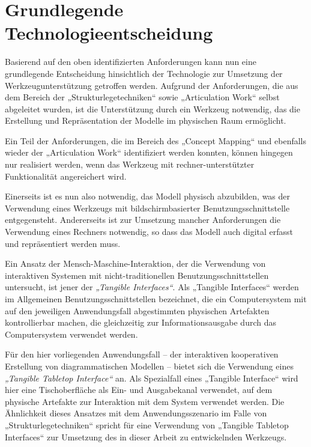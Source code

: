 

\section{Grundlegende Technologieentscheidung} %
\label{sec:grundlegende_technologieentscheidung}

Basierend auf den oben identifizierten Anforderungen kann nun eine grundlegende Entscheidung hinsichtlich der Technologie zur Umsetzung der Werkzeugunterstützung getroffen werden. Aufgrund der Anforderungen, die aus dem Bereich der „Strukturlegetechniken“ sowie „Articulation Work“ selbst abgeleitet wurden, ist die Unterstützung durch ein Werkzeug notwendig, das die Erstellung und Repräsentation der Modelle im physischen Raum ermöglicht.

Ein Teil der Anforderungen, die im Bereich des „Concept Mapping“ und ebenfalls wieder der „Articulation Work“ identifiziert werden konnten, können hingegen nur realisiert werden, wenn das Werkzeug mit rechner-unterstützter Funktionalität angereichert wird.

Einerseits ist es nun also notwendig, das Modell physisch abzubilden, was der Verwendung eines Werkzeugs mit  bildschirmbasierter Benutzungsschnittstelle entgegensteht. Andererseits ist zur Umsetzung mancher Anforderungen die Verwendung eines Rechners notwendig, so dass das Modell auch digital erfasst und repräsentiert werden muss.

Ein Ansatz der Mensch-Maschine-Interaktion, der die Verwendung von interaktiven Systemen mit nicht-traditionellen Benutzungsschnittstellen untersucht, ist jener der \emph{„Tangible Interfaces“}. Als „Tangible Interfaces“ werden im Allgemeinen Benutzungsschnittstellen bezeichnet, die ein Computersystem mit auf den jeweiligen Anwendungsfall abgestimmten physischen Artefakten kontrollierbar machen, die gleichzeitig zur Informationsausgabe durch das Computersystem verwendet werden.

Für den hier vorliegenden Anwendungsfall -- der interaktiven kooperativen Erstellung von diagrammatischen Modellen -- bietet sich die Verwendung eines \emph{„Tangible Tabletop Interface“} an. Als Spezialfall eines „Tangible Interface“ wird hier eine Tischoberfläche als Ein- und Ausgabekanal verwendet, auf dem physische Artefakte zur Interaktion mit dem System verwendet werden. Die Ähnlichkeit dieses Ansatzes mit dem Anwendungsszenario im Falle von „Strukturlegetechniken“ spricht für eine Verwendung von „Tangible Tabletop Interfaces“ zur Umsetzung des in dieser Arbeit zu entwickelnden Werkzeugs. 

